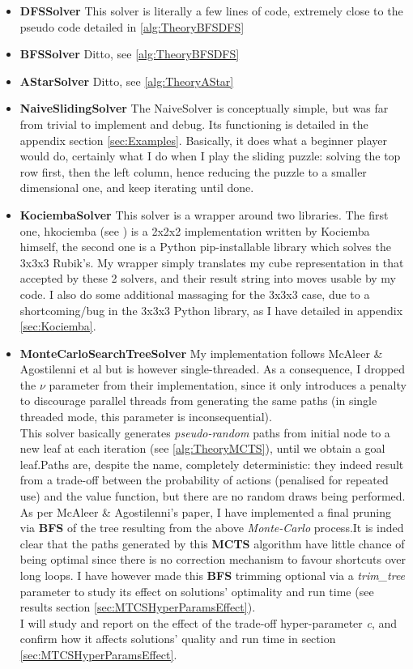 \begin{itemize}
\item \textbf{DFSSolver} This solver is literally a few lines of code, extremely close to the pseudo code detailed in \ref{alg:TheoryBFSDFS}
\item \textbf{BFSSolver} Ditto, see \ref{alg:TheoryBFSDFS}
\item \textbf{AStarSolver} Ditto, see \ref{alg:TheoryAStar}
\item \textbf{NaiveSlidingSolver} The NaiveSolver is conceptually simple, but was far from trivial to implement and debug. Its functioning is detailed in the appendix section \ref{sec:Examples}. Basically, it does what a beginner player would do, certainly what I do when I play the sliding puzzle: solving the top row first, then the left column, hence reducing the puzzle to a smaller dimensional one, and keep iterating until done.
\item \textbf{KociembaSolver} This solver is a wrapper around two libraries. The first one, hkociemba (see \cite{HKociemba}) is a 2x2x2 implementation written by Kociemba himself, the second one is a Python pip-installable library which solves the 3x3x3 Rubik's. My  wrapper simply translates my cube representation in that accepted by these 2 solvers, and their result string into moves usable by my code. I also do some additional massaging for the 3x3x3 case, due to a shortcoming/bug in the 3x3x3 Python library, as I have detailed in appendix \ref{sec:Kociemba}.
\item \textbf{MonteCarloSearchTreeSolver} My implementation follows McAleer \& Agostilenni et al \cite{https://doi.org/10.48550/arxiv.1805.07470} but is however single-threaded. As a consequence, I dropped the $\nu$ parameter from their implementation, since it only introduces a penalty to discourage parallel threads from generating the same paths (in single threaded mode, this parameter is inconsequential).
\\
This solver basically generates \textit{pseudo-random} paths from initial node to a new leaf at each iteration (see \ref{alg:TheoryMCTS}), until we obtain a goal leaf.Paths are, despite the name, completely deterministic: they indeed result from a trade-off between the probability of actions (penalised for repeated use) and the value function, but there are no random draws being performed.
\\ As per McAleer \& Agostilenni's paper, I have implemented a final pruning via \textbf{BFS} of the tree resulting from the above \textit{Monte-Carlo} process.It is inded clear that the paths generated by this \textbf{MCTS} algorithm have little chance of being optimal since there is no correction mechanism to favour shortcuts over long loops. I have however made this \textbf{BFS} trimming optional via a \textit{trim\_tree} parameter to study its effect on solutions' optimality and run time (see results section \ref{sec:MTCSHyperParamsEffect}).
\\
I will study and report on the effect of the trade-off hyper-parameter \textit{c}, and confirm how it affects solutions' quality and run time in section \ref{sec:MTCSHyperParamsEffect}.

\end{itemize}

